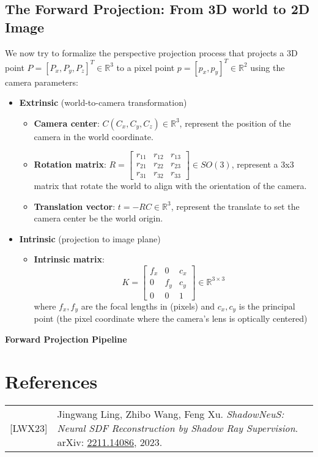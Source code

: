 \documentclass[12pt]{article}
\begin{document}
\newpage

\subsection{The Forward Projection: From 3D world to 2D Image}
We now try to formalize the perspective projection process that projects a 3D point $P=[P_x,P_y,P_z]^T \in \mathbb{R}^3$ to a pixel point $p=[p_x,p_y]^T \in \mathbb{R}^2$ using the camera parameters:
\begin{itemize}
    \item \textbf{Extrinsic} (world-to-camera transformation)
        \begin{itemize}
            \item \textbf{Camera center}: $C(C_x, C_y, C_z) \in \mathbb{R}^3$, represent the position of the camera in the world coordinate.
            \item \textbf{Rotation matrix}: $R = 
                \begin{bmatrix}
                    r_{11} & r_{12} & r_{13} \\
                    r_{21} & r_{22} & r_{23} \\
                    r_{31} & r_{32} & r_{33}
                \end{bmatrix}
                \in SO(3)$, represent a 3x3 matrix that rotate the world to align with the orientation of the camera.
            \item \textbf{Translation vector}: $t = -RC \in \mathbb{R}^3$, represent the translate to set the camera center be the world origin.
        \end{itemize}
    \item \textbf{Intrinsic} (projection to image plane)
        \begin{itemize}
            \item \textbf{Intrinsic matrix}: 
                \[
                    K = \begin{bmatrix}
                    f_x & 0 & c_x \\
                    0 & f_y & c_y \\
                    0 & 0 & 1
                    \end{bmatrix} \in \mathbb{R}^{3 \times 3}
                \]
            where \(f_x, f_y\) are the focal lengths in (pixels) and \(c_x, c_y\) is the principal point (the pixel coordinate where the camera's lens is optically centered)
        \end{itemize}
\end{itemize}

\textbf{Forward Projection Pipeline}


\newpage
\section*{References}
\begin{tabular}{@{}p{} p{}}
{[LWX23]} & Jingwang Ling, Zhibo Wang, Feng Xu. \textit{ShadowNeuS: Neural SDF Reconstruction by Shadow Ray Supervision}. arXiv: \href{https://arxiv.org/abs/2211.14086}{2211.14086}, 2023.
\end{tabular}
\end{document}
